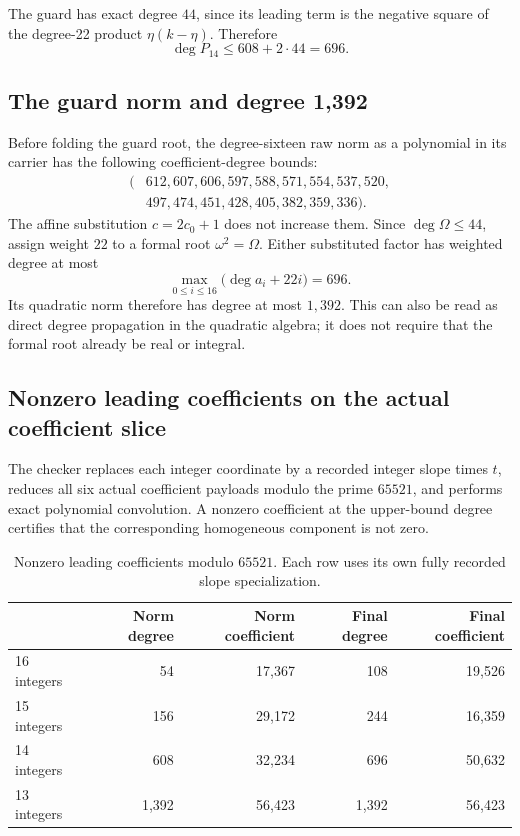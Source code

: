\documentclass[11pt]{article}
\theoremstyle{definition}
\theoremstyle{remark}
\begin{document}
The guard has exact degree \(44\), since its leading term is the negative
square of the degree-22 product \(\eta(k-\eta)\). Therefore
\[
 \deg P_{14}\le608+2\cdot44=696.
\]

\subsection{The guard norm and degree 1,392}

Before folding the guard root, the degree-sixteen raw norm as a
polynomial in its carrier has the following coefficient-degree bounds:
\[
\begin{split}
 (&612,607,606,597,588,571,554,537,520,\\
  &497,474,451,428,405,382,359,336).
\end{split}
\]
The affine substitution \(c=2c_0+1\) does not increase them.
Since \(\deg\Omega\le44\), assign weight \(22\) to a formal root
\(\omega^2=\Omega\). Either substituted factor has weighted degree at
most
\[
 \max_{0\le i\le16}\bigl(\deg a_i+22i\bigr)=696.
\]
Its quadratic norm therefore has degree at most \(1,392\).
This can also be read as direct degree propagation in the quadratic
algebra; it does not require that the formal root already be real or
integral.

\subsection{Nonzero leading coefficients on the actual coefficient slice}

The checker replaces each integer coordinate by a recorded integer slope
times \(t\), reduces all six actual coefficient payloads modulo the prime
\(65521\), and performs exact polynomial convolution. A nonzero
coefficient at the upper-bound degree certifies that the corresponding
homogeneous component is not zero.

\begin{table}[ht]
\centering
\begin{tabular}{@{}lrrrr@{}}
\toprule
 & Norm degree & Norm coefficient & Final degree & Final coefficient\\
\midrule
16 integers & 54 & 17,367 & 108 & 19,526\\
15 integers & 156 & 29,172 & 244 & 16,359\\
14 integers & 608 & 32,234 & 696 & 50,632\\
13 integers & 1,392 & 56,423 & 1,392 & 56,423\\
\bottomrule
\end{tabular}
\caption{Nonzero leading coefficients modulo \(65521\). Each row uses its
own fully recorded slope specialization.}
\label{tab:degreecert}
\end{table}
\end{document}
